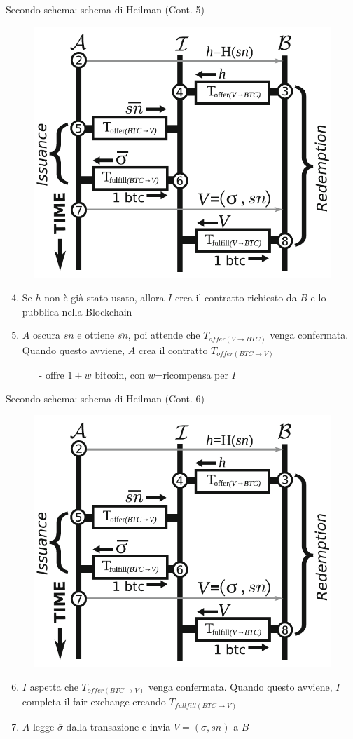 \documentclass{beamer}
\begin{document}
  
   \begin{frame}{Secondo schema: schema di Heilman (Cont. 5)}
      \begin{figure}
          \centering
          \includegraphics[width=0.4\linewidth]{../img/heilman-scheme.png}
      \end{figure}
      
      \begin{enumerate}
      \setcounter{enumi}{3}
          \item Se $h$ non è già stato usato, allora $I$ crea il contratto richiesto da $B$ e lo pubblica nella Blockchain \pause
          \item $A$ oscura $sn$ e ottiene $\overline{sn}$, poi attende che $T_{offer(V\rightarrow BTC)}$ venga confermata. Quando questo avviene, $A$ crea il contratto $T_{offer(BTC\rightarrow V)}$
          \begin{itemize}
              \item[-] offre $1+w$ bitcoin, con $w$=ricompensa per $I$
          \end{itemize}
      \end{enumerate}
  \end{frame}
  
  
  
  
  \begin{frame}{Secondo schema: schema di Heilman (Cont. 6)}
      \begin{figure}
          \centering
          \includegraphics[width=0.4\linewidth]{../img/heilman-scheme.png}
      \end{figure}
      
      \begin{enumerate}
      \setcounter{enumi}{5}
          \item $I$ aspetta che $T_{offer(BTC\rightarrow V)}$ venga confermata. Quando questo avviene, $I$ completa il fair exchange creando $T_{fullfill(BTC\rightarrow V)}$
          \item $A$ legge $\overline{\sigma}$ dalla transazione e invia $V=(\sigma,sn)$ a $B$
      \end{enumerate}
  \end{frame}
  
\end{document}
